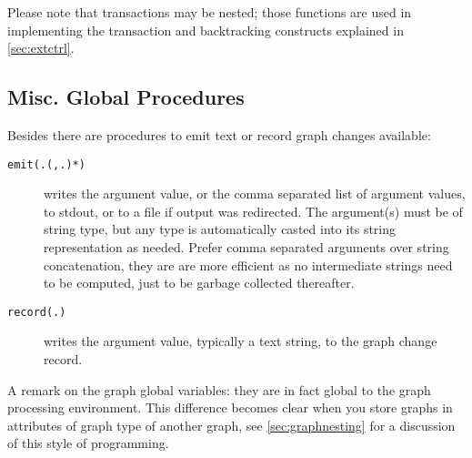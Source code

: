 Please note that transactions may be nested; those functions are used in implementing the transaction and backtracking constructs explained in \ref{sec:extctrl}.


\subsection{Misc. Global Procedures}

Besides there are procedures to emit text or record graph changes available: 

\begin{description}
\item[\texttt{emit(.(,.)*)}] writes the argument value, or the comma separated list of argument values, to stdout, or to a file if output was redirected. The argument(s) must be of string type, but any type is automatically casted into its string representation as needed. Prefer comma separated arguments over string concatenation, they are are more efficient as no intermediate strings need to be computed, just to be garbage collected thereafter.
\item[\texttt{record(.)}] writes the argument value, typically a text string, to the graph change record.
\end{description}

A remark on the graph global variables: they are in fact global to the graph processing environment.
This difference becomes clear when you store graphs in attributes of graph type of another graph, see \ref{sec:graphnesting} for a discussion of this style of programming.


